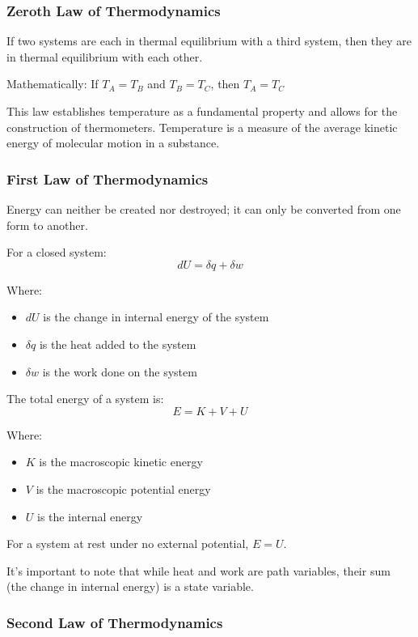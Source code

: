 \documentclass{article}
\theoremstyle{definition}
\begin{document}
\subsubsection{Zeroth Law of Thermodynamics}

If two systems are each in thermal equilibrium with a third system, then they are in thermal equilibrium with each other.

Mathematically: If $T_A = T_B$ and $T_B = T_C$, then $T_A = T_C$

This law establishes temperature as a fundamental property and allows for the construction of thermometers. Temperature is a measure of the average kinetic energy of molecular motion in a substance.

\subsubsection{First Law of Thermodynamics}

Energy can neither be created nor destroyed; it can only be converted from one form to another.

For a closed system:
\[
dU = \delta q + \delta w
\]

Where:
\begin{itemize}
    \item $dU$ is the change in internal energy of the system
    \item $\delta q$ is the heat added to the system
    \item $\delta w$ is the work done on the system
\end{itemize}

The total energy of a system is:
\[
E = K + V + U
\]

Where:
\begin{itemize}
    \item $K$ is the macroscopic kinetic energy
    \item $V$ is the macroscopic potential energy
    \item $U$ is the internal energy
\end{itemize}

For a system at rest under no external potential, $E = U$.

It's important to note that while heat and work are path variables, their sum (the change in internal energy) is a state variable.

\subsubsection{Second Law of Thermodynamics}
\end{document}
